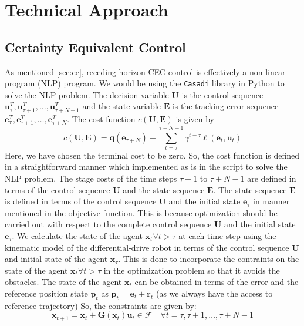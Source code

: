 \documentclass[conference]{IEEEtran}
\begin{document}
\section{Technical Approach}
\subsection{Certainty Equivalent Control}
As mentioned \ref{sec:ce}, receding-horizon CEC control is effectively a non-linear program (NLP) program. We would be using the \texttt{Casadi} library in Python to solve the NLP problem.
The decision variable $\mathbf{U}$ is the control sequence $\mathbf{u}_\tau^T, \mathbf{u}_{\tau+1}^T, \dots, \mathbf{u}_{\tau+N-1}^T$ and the state variable $\mathbf{E}$ is the tracking error sequence $\mathbf{e}_\tau^T, \mathbf{e}_{\tau+1}^T, \dots, \mathbf{e}_{\tau+N}^T$. The cost function $c(\mathbf{U}, \mathbf{E})$ is given by
\begin{equation}
    c(\mathbf{U}, \mathbf{E}) = \mathbf{q}(\mathbf{e}_{\tau + N}) + \sum_{t=\tau}^{\tau+N-1} \gamma^{t-\tau} \ell(\mathbf{e}_t, \mathbf{u}_t)
\end{equation}
Here, we have chosen the terminal cost to be zero. So, the cost function is defined in a straightforward manner which implemented as is in the script to 
solve the NLP problem. The stage costs of the time steps $\tau + 1$ to $\tau + N -1$ are defined in terms of the control sequence $\mathbf{U}$ and the state sequence $\mathbf{E}$.
The state sequence $\mathbf{E}$ is defined in terms of the control sequence $\mathbf{U}$ and the initial state $\mathbf{e}_\tau$ in manner mentioned in the objective function. 
This is because optimization should be carried out with respect to the complete control sequence $\mathbf{U}$ and the initial state $\mathbf{e}_\tau$. We calculate the state of the agent $\mathbf{x}_t \forall t > \tau$
at each time step using the kinematic model of the differential-drive robot in terms of the control sequence $\mathbf{U}$ and initial state of the agent $\mathbf{x}_\tau$. This is done to incorporate the contraints
on the state of the agent $\mathbf{x}_t \forall t > \tau$ in the optimization problem so that it avoids the obstacles. The state of the agent $\mathbf{x}_t$ can be obtained in terms of the error and the reference position state $\mathbf{p}_t$ as $\mathbf{p}_t = \mathbf{e}_t + \mathbf{r}_t$ (as we always have the access to reference trajectory)
So, the constraints are given by:
\begin{equation}
    \mathbf{x}_{t+1} = \mathbf{x}_t + \mathbf{G}(\mathbf{x}_t)\mathbf{u}_t \in \mathcal{F} \quad \forall t = \tau, \tau+1, \dots, \tau+N-1
\end{equation}
\end{document}
